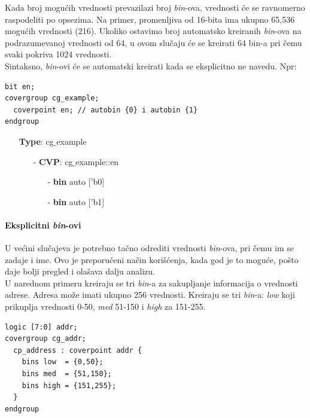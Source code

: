 Kada broj mogućih vrednosti prevazilazi broj \emph{bin}-ova, vrednosti će se
ravnomerno raspodeliti po opsezima. Na primer, promenljiva od 16-bita ima ukupno
65,536 mogućih vrednosti (216). Ukoliko ostavimo broj automatsko kreiranih
\emph{bin}-ova na podrazumevanoj vrednosti od 64, u ovom slučaju će se kreirati
64 bin-a pri čemu svaki pokriva 1024 vrednosti.\\

Sintaksno, \emph{bin}-ovi će se automatski kreirati kada se eksplicitno ne
navedu. Npr:

\begin{lstlisting}
bit en;
covergroup cg_example;
  coverpoint en; // autobin {0} i autobin {1}
endgroup
\end{lstlisting}

\begin{itemize}
\item[] \textbf{Type}: cg\(\_\)example
  \begin{itemize}
  \item[-] \textbf{CVP}: cg\(\_\)example::en
    \begin{itemize}
    \item[-] \textbf{bin} auto ['b0]
    \item[-] \textbf{bin} auto ['b1]
    \end{itemize}
  \end{itemize}
\end{itemize}

\paragraph{Eksplicitni \emph{bin}-ovi}

U većini slučajeva je potrebno tačno odrediti vrednosti \emph{bin}-ova, pri čemu
im se zadaje i ime. Ovo je preporučeni način korišćenja, kada god je to moguće,
pošto daje bolji pregled i olašava dalju analizu.\\

U narednom primeru kreiraju se tri \emph{bin}-a za sakupljanje informacija o
vrednosti adrese. Adresa može imati ukupno 256 vrednosti. Kreiraju se tri
\emph{bin}-a: \emph{low} koji prikuplja vrednosti 0-50, \emph{med} 51-150 i
\emph{high} za 151-255.

\begin{lstlisting}
logic [7:0] addr;
covergroup cg_addr;
  cp_address : coverpoint addr {
    bins low  = {0,50};
    bins med  = {51,150};
    bins high = {151,255};
  }
endgroup
\end{lstlisting}

